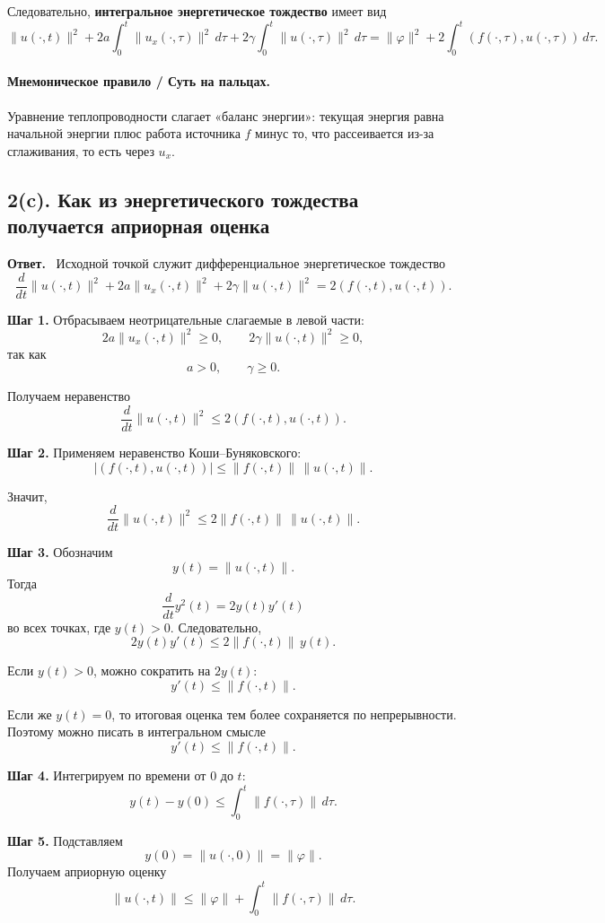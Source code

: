 \documentclass[a4paper,12pt]{article}
\newcommand{\Answer}{\textbf{Ответ.}\ }
\begin{document}
Следовательно, \textbf{интегральное энергетическое тождество} имеет вид
\[
\|u(\cdot,t)\|^2
+2a\int_0^t \|u_x(\cdot,\tau)\|^2\,d\tau
+2\gamma\int_0^t \|u(\cdot,\tau)\|^2\,d\tau
=
\|\varphi\|^2
+2\int_0^t (f(\cdot,\tau),u(\cdot,\tau))\,d\tau.
\]

\paragraph{Мнемоническое правило / Суть на пальцах.}
Уравнение теплопроводности слагает «баланс энергии»: текущая энергия равна начальной энергии плюс работа источника $f$ минус то, что рассеивается из-за сглаживания, то есть через $u_x$.

\subsection*{2(c). Как из энергетического тождества получается априорная оценка}

\Answer
Исходной точкой служит дифференциальное энергетическое тождество
\[
\frac{d}{dt}\|u(\cdot,t)\|^2
+2a\|u_x(\cdot,t)\|^2
+2\gamma\|u(\cdot,t)\|^2
=
2(f(\cdot,t),u(\cdot,t)).
\]

\textbf{Шаг 1.} Отбрасываем неотрицательные слагаемые в левой части:
\[
2a\|u_x(\cdot,t)\|^2\ge 0,
\qquad
2\gamma\|u(\cdot,t)\|^2\ge 0,
\]
так как
\[
a>0,
\qquad
\gamma\ge 0.
\]

Получаем неравенство
\[
\frac{d}{dt}\|u(\cdot,t)\|^2
\le
2(f(\cdot,t),u(\cdot,t)).
\]

\textbf{Шаг 2.} Применяем неравенство Коши--Буняковского:
\[
|(f(\cdot,t),u(\cdot,t))|
\le
\|f(\cdot,t)\|\,\|u(\cdot,t)\|.
\]

Значит,
\[
\frac{d}{dt}\|u(\cdot,t)\|^2
\le
2\|f(\cdot,t)\|\,\|u(\cdot,t)\|.
\]

\textbf{Шаг 3.} Обозначим
\[
y(t)=\|u(\cdot,t)\|.
\]
Тогда
\[
\frac{d}{dt}y^2(t)=2y(t)y'(t)
\]
во всех точках, где $y(t)>0$. Следовательно,
\[
2y(t)y'(t)\le 2\|f(\cdot,t)\|\,y(t).
\]

Если $y(t)>0$, можно сократить на $2y(t)$:
\[
y'(t)\le \|f(\cdot,t)\|.
\]

Если же $y(t)=0$, то итоговая оценка тем более сохраняется по непрерывности. Поэтому можно писать в интегральном смысле
\[
y'(t)\le \|f(\cdot,t)\|.
\]

\textbf{Шаг 4.} Интегрируем по времени от $0$ до $t$:
\[
y(t)-y(0)\le \int_0^t \|f(\cdot,\tau)\|\,d\tau.
\]

\textbf{Шаг 5.} Подставляем
\[
y(0)=\|u(\cdot,0)\|=\|\varphi\|.
\]
Получаем априорную оценку
\[
\|u(\cdot,t)\|
\le
\|\varphi\|
+\int_0^t \|f(\cdot,\tau)\|\,d\tau.
\]
\end{document}
